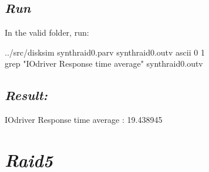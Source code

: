 \documentclass[conference]{IEEEtran}
\begin{document}
\subsection{\emph{\textbf{Run}}}
\begin{flushleft}
  In the valid folder, run:
\end{flushleft}
   ../src/disksim synthraid0.parv synthraid0.outv ascii 0 1\\
   grep "IOdriver Response time average" synthraid0.outv

\subsection{\emph{\textbf{Result:}}}
\begin{flushleft}
  IOdriver Response time average : 19.438945
\end{flushleft}

\section{\emph{\textbf{Raid5}}}
\end{document}

